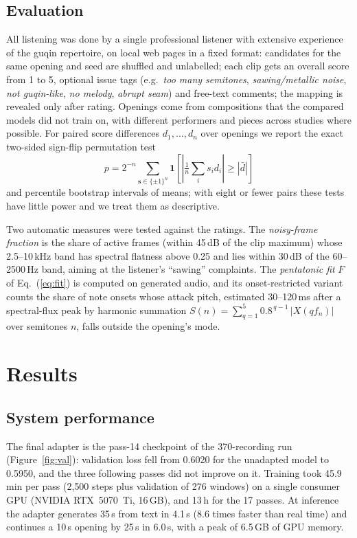 \subsection{Evaluation}\label{sec:eval}
All listening was done by a single professional listener with extensive experience of the guqin repertoire, on local web pages in
a fixed format: candidates for the same opening and seed are shuffled and unlabelled; each clip gets an overall
score from 1 to 5, optional issue tags (e.g.\ \textit{too many semitones}, \textit{sawing/metallic noise},
\textit{not guqin-like}, \textit{no melody}, \textit{abrupt seam}) and free-text comments; the mapping is revealed only
after rating. Openings come from compositions that the compared models did not train on, with different performers
and pieces across studies where possible. For paired score differences $d_1,\dots,d_n$ over openings we report the
exact two-sided sign-flip permutation test
\begin{equation}
  p = 2^{-n}\sum_{\mathbf{s}\in\{\pm1\}^n} \mathbf{1}\!\left[\left|\tfrac{1}{n}\textstyle\sum_i s_i d_i\right| \ge \left|\bar{d}\right|\right]
\end{equation}
and percentile bootstrap intervals of means; with eight or fewer pairs these tests have little power and we treat
them as descriptive.

Two automatic measures were tested against the ratings. The \emph{noisy-frame fraction} is the share of active
frames (within 45\,dB of the clip maximum) whose 2.5--10\,kHz band has spectral flatness above 0.25 and lies within
30\,dB of the 60--2500\,Hz band, aiming at the listener's ``sawing'' complaints. The \emph{pentatonic fit} $F$ of
Eq.~(\ref{eq:fit}) is computed on generated audio, and its onset-restricted variant counts the share of note onsets
whose attack pitch, estimated 30--120\,ms after a spectral-flux peak by harmonic summation
$S(n)=\sum_{q=1}^{5} 0.8^{\,q-1}\,|X(q f_n)|$ over semitones $n$, falls outside the opening's mode.

\section{Results}\label{sec:results}

\subsection{System performance}\label{sec:performance}
The final adapter is the pass-14 checkpoint of the 370-recording run (Figure~\ref{fig:val}): validation loss fell from
0.6020 for the unadapted model to 0.5950, and the three following passes did not improve on it. Training took
45.9\,min per pass (2{,}500 steps plus validation of 276 windows) on a single consumer GPU (NVIDIA RTX~5070~Ti, 16\,GB),
and 13\,h for the 17 passes. At inference the adapter generates 35\,s from text in 4.1\,s (8.6 times faster than real
time) and continues a 10\,s opening by 25\,s in 6.0\,s, with a peak of 6.5\,GB of GPU memory.

